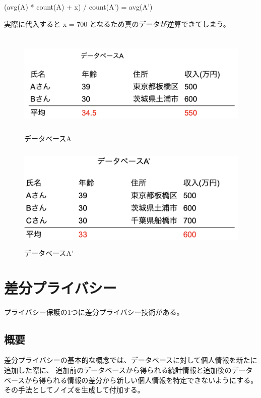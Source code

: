 \documentclass[a4paper,11pt]{jreport}
\begin{document}
(avg(A) * count(A) + x) / count(A') = avg(A')

実際に代入すると x = 700 となるため真のデータが逆算できてしまう。

\begin{figure}[htbp]
    \centering
\includegraphics[height=50mm]{database-a.png}
    \caption{データベースA}
    \label{fig:database-a}
\end{figure}

\begin{figure}[htbp]
    \centering
\includegraphics[height=50mm]{database-a2.png}
    \caption{データベースA'}
    \label{fig:database-a2}
\end{figure}

\section{差分プライバシー}
プライバシー保護の1つに差分プライバシー技術がある。\cite{dp}

\subsection{概要}
差分プライバシーの基本的な概念では、データベースに対して個人情報を新たに追加した際に、
追加前のデータベースから得られる統計情報と追加後のデータベースから得られる情報の差分から新しい個人情報を特定できないようにする。
その手法としてノイズを生成して付加する。
\end{document}
